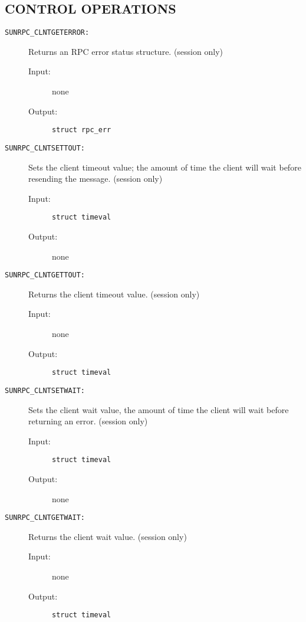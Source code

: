 \subsection*{CONTROL OPERATIONS}

\begin{description}

\item[{\tt SUNRPC\_CLNTGETERROR:}]
Returns an RPC error status structure.  (session only)
\begin{description}
\item[{\rm Input:}] none
\item[{\rm Output:}] {\tt struct rpc\_err}
\end{description}

\item[{\tt SUNRPC\_CLNTSETTOUT:}]
Sets the client timeout value; the amount of time the client 
will wait before resending the message.  (session only)
\begin{description}
\item[{\rm Input:}] {\tt struct timeval }
\item[{\rm Output:}] none
\end{description}

\item[{\tt SUNRPC\_CLNTGETTOUT:}]
Returns the client timeout value.  (session only)
\begin{description}
\item[{\rm Input:}] none
\item[{\rm Output:}] {\tt struct timeval }
\end{description}

\item[{\tt SUNRPC\_CLNTSETWAIT:}]
Sets the client wait value, the amount of time the client will 
wait before returning an error.  (session only)
\begin{description}
\item[{\rm Input:}] {\tt struct timeval }
\item[{\rm Output:}] none
\end{description}

\item[{\tt SUNRPC\_CLNTGETWAIT:}]
Returns the client wait value.  (session only)
\begin{description}
\item[{\rm Input:}] none
\item[{\rm Output:}] {\tt struct timeval }
\end{description}


\end{description}
